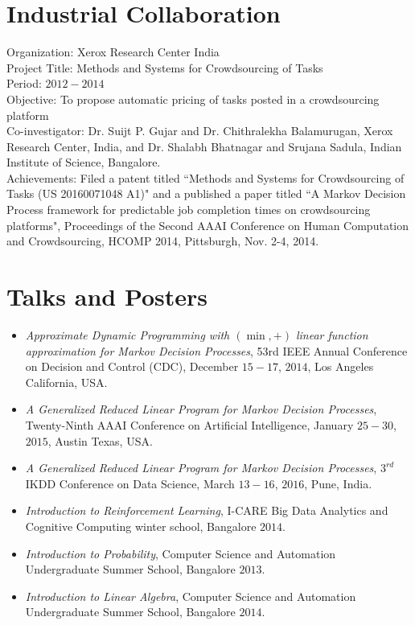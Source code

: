 \documentclass[line,margin]{res}
\begin{document}
\begin{resume}
\section{Industrial Collaboration}
Organization: Xerox Research Center India\\
Project Title: Methods and Systems for Crowdsourcing of Tasks \\
Period: $2012-2014$\\
Objective: To propose automatic pricing of tasks posted in a crowdsourcing platform\\
Co-investigator: Dr. Suijt P. Gujar and Dr. Chithralekha Balamurugan, Xerox Research Center, India, and Dr. Shalabh Bhatnagar and Srujana Sadula, Indian Institute of Science, Bangalore.\\
Achievements: Filed a patent titled ``Methods and Systems for Crowdsourcing of Tasks (US 20160071048 A1)" and a published a paper titled ``A Markov Decision Process framework for predictable job completion times on crowdsourcing platforms", Proceedings of the Second {AAAI} Conference on Human Computation and Crowdsourcing, {HCOMP} 2014, Pittsburgh, Nov. 2-4, 2014.

\section{Talks and Posters}
\begin{itemize}
\item \emph{Approximate Dynamic Programming with $(\min,+)$ linear function approximation for Markov Decision Processes}, 53rd IEEE Annual Conference on Decision and Control (CDC), December $15-17$, $2014$, Los Angeles California, USA.
\item \emph{A Generalized Reduced Linear Program for Markov Decision Processes}, Twenty-Ninth AAAI Conference on Artificial Intelligence, January $25-30$, $2015$, Austin Texas, USA.
\item \emph{A Generalized Reduced Linear Program for Markov Decision Processes}, $3^{rd}$ IKDD Conference on Data Science, March $13-16$, $2016$, Pune, India.
\item \emph{Introduction to Reinforcement Learning}, I-CARE Big Data Analytics and Cognitive Computing winter school, Bangalore $2014$.
\item \emph{Introduction to Probability}, Computer Science and Automation Undergraduate Summer School, Bangalore $2013$.
\item \emph{Introduction to Linear Algebra}, Computer Science and Automation Undergraduate Summer School, Bangalore $2014$.
\end{itemize}


\end{resume}
\end{document}
